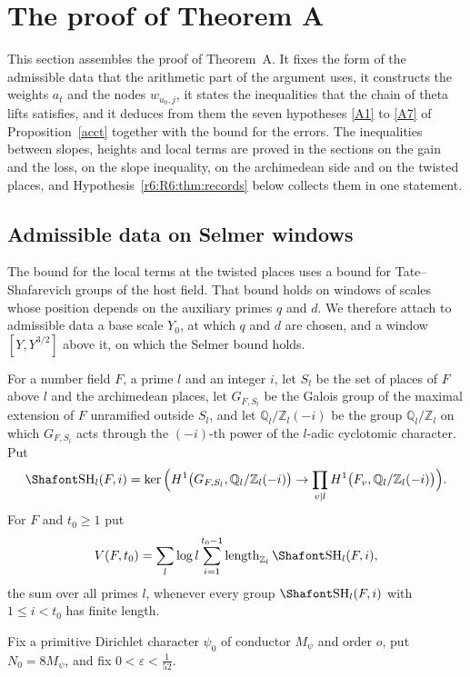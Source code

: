 
\section{The proof of Theorem A}\label{sec:proofA}

This section assembles the proof of Theorem~A. It fixes the form of the admissible data that the arithmetic part of the argument uses, it constructs the weights $a_t$ and the nodes $w_{u_0,j}$, it states the inequalities that the chain of theta lifts satisfies, and it deduces from them the seven hypotheses \eqref{A1} to \eqref{A7} of Proposition~\ref{acct} together with the bound for the errors. The inequalities between slopes, heights and local terms are proved in the sections on the gain and the loss, on the slope inequality, on the archimedean side and on the twisted places, and Hypothesis~\ref{r6:R6:thm:records} below collects them in one statement.

\subsection{Admissible data on Selmer windows}\label{r6:R6:sec:adm}

The bound for the local terms at the twisted places uses a bound for Tate--Shafarevich groups of the host field. That bound holds on windows of scales whose position depends on the auxiliary primes $q$ and $d$. We therefore attach to admissible data a base scale $Y_0$, at which $q$ and $d$ are chosen, and a window $[Y,Y^{3/2}]$ above it, on which the Selmer bound holds.

For a number field $F$, a prime $l$ and an integer $i$, let $S_l$ be the set of places of $F$ above $l$ and the archimedean places, let $G_{F,S_l}$ be the Galois group of the maximal extension of $F$ unramified outside $S_l$, and let $\mathbb Q_l/\mathbb Z_l(-i)$ be the group $\mathbb Q_l/\mathbb Z_l$ on which $G_{F,S_l}$ acts through the $(-i)$-th power of the $l$-adic cyclotomic character. Put
\[
\Sha_l(F,i)=\ker\Big(H^1\big(G_{F,S_l},\mathbb Q_l/\mathbb Z_l(-i)\big)\to\prod_{v\mid l}H^1\big(F_v,\mathbb Q_l/\mathbb Z_l(-i)\big)\Big).
\]
For $F$ and $t_0\ge1$ put
\[
V(F,t_0)=\sum_{l}\log l\sum_{i=1}^{t_0-1}\operatorname{length}_{\mathbb Z_l}\Sha_l(F,i),
\]
the sum over all primes $l$, whenever every group $\Sha_l(F,i)$ with $1\le i<t_0$ has finite length.

Fix a primitive Dirichlet character $\psi_0$ of conductor $M_\psi$ and order $o$, put $N_0=8M_\psi$, and fix $0<\varepsilon<\frac1{52}$.

